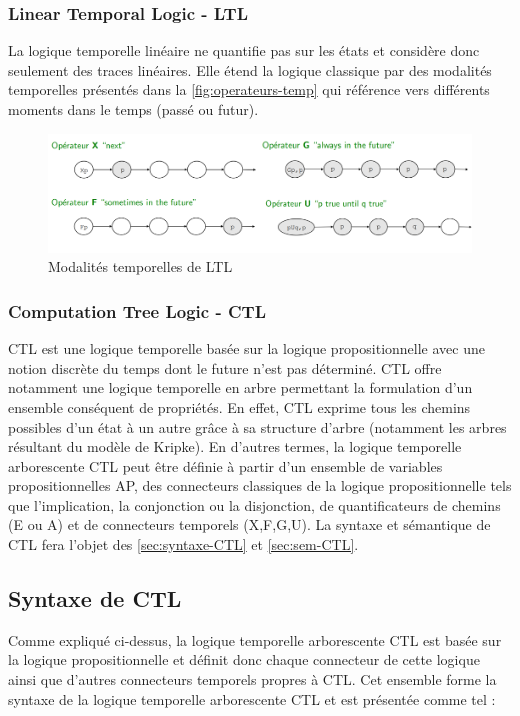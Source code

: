 \documentclass[runningheads,a4paper,10pt]{llncs}
\begin{document}
\subsubsection{Linear Temporal Logic - LTL}
La logique temporelle linéaire ne quantifie pas sur les états et considère donc seulement des traces linéaires. Elle étend la logique classique par des modalités temporelles présentés dans la \autoref{fig:operateurs-temp} qui référence vers différents moments dans le temps (passé ou futur). 

\begin{figure}
  \centering
   \includegraphics[scale=0.43]{figures/operateurs-temp.png}
   \caption[Caption for LOF]{Modalités temporelles de LTL\protect\footnotemark}
   \label{fig:operateurs-temp}
\end{figure}


\subsubsection{Computation Tree Logic - CTL}
CTL est une logique temporelle basée sur la logique propositionnelle avec une notion discrète du temps dont le future n'est pas déterminé. CTL offre notamment une logique temporelle en arbre permettant la formulation d'un ensemble conséquent de propriétés. En effet, CTL exprime tous les chemins possibles d'un état à un autre grâce à sa structure d'arbre (notamment les arbres résultant du modèle de Kripke). En d'autres termes, la logique temporelle arborescente CTL peut être définie à partir d’un ensemble de variables propositionnelles AP, des connecteurs classiques de la logique propositionnelle tels que l'implication, la conjonction ou la disjonction, de quantificateurs de chemins (E ou A) et de connecteurs temporels (X,F,G,U). La syntaxe et sémantique de CTL fera l'objet des \autoref{sec:syntaxe-CTL} et \autoref{sec:sem-CTL}. \\

\subsection{Syntaxe de CTL} \label{sec:syntaxe-CTL}
Comme expliqué ci-dessus, la logique temporelle arborescente CTL est basée sur la logique propositionnelle et définit donc chaque connecteur de cette logique ainsi que d'autres connecteurs temporels propres à CTL. Cet ensemble forme la syntaxe de la logique temporelle arborescente CTL et est présentée comme tel : \\
\end{document}

